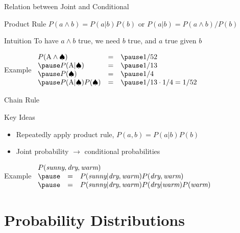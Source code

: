 \documentclass[14pt]{beamer}
\begin{document}
\begin{frame}{Relation between Joint and Conditional}
	\begin{block}{Product Rule}
		$P(a \land b) = P(a|b)P(b)$ \hfill or \hfill $P(a|b) = P(a \land b)/P(b)$
	\end{block}
	\pause
	\begin{block}{Intuition}
		To have $a \land b$ true, we need $b$ true, and $a$ true given $b$
	\end{block}
	\pause
	\begin{block}{Example}
		$
		\begin{array}{lll}
			P(\mbox{A} \land \spadesuit)        & = & \pause 1/52 \\
			\pause
			P(\mbox{A}|\spadesuit)              & = & \pause 1/13 \\
			\pause
			P(\spadesuit)                       & = & \pause 1/4  \\
			\pause
			P(\mbox{A}|\spadesuit)P(\spadesuit) & = & \pause 1/13 \cdot 1/4 = 1/52 \\
		\end{array}
		$
	\end{block}
\end{frame}
\begin{frame}{Chain Rule}
	\begin{block}{Key Ideas}
		\begin{itemize}
			\item Repeatedly apply product rule, $P(a,b) = P(a|b)P(b)$
			\item Joint probability $\rightarrow$ conditional probabilities
		\end{itemize}
	\end{block}
	\pause
	\begin{block}{Example}
		$
		\begin{array}{lll}
		\lefteqn{P(\textit{sunny}, \textit{dry}, \textit{warm})} \\
		\pause
		& = & P(\textit{sunny}|\textit{dry}, \textit{warm})P(\textit{dry}, \textit{warm})\\
		\pause
		& = & P(\textit{sunny}|\textit{dry}, \textit{warm})P(\textit{dry}|\textit{warm})P(\textit{warm}) \\
		\end{array}
		$
	\end{block}
\end{frame}


\section{Probability Distributions}
\end{document}
